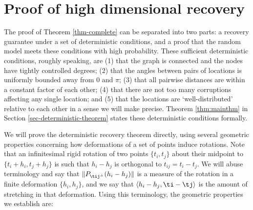 \section{Proof of high dimensional recovery} \label{sec-proofs-high-d}

The proof of Theorem \ref{thm-complete} can be separated into two parts:  a recovery guarantee under a set of deterministic conditions, and a proof that the random model meets these conditions with high probability.  These sufficient deterministic conditions, roughly speaking, are (1) that the graph is connected and the nodes have tightly controlled degrees; (2) that the angles between pairs of locations is uniformly bounded away from $0$ and $\pi$; (3) that all pairwise distances are within a constant factor of each other; (4) that there are not too many corruptions affecting any single location; and (5) that the locations are `well-distributed' relative to each other in a sense we will make precise.   Theorem \ref{thm:mainthm} in Section \ref{sec-deterministic-theorem} states these deterministic conditions formally.

We will prove the deterministic recovery theorem directly, using several geometric properties concerning how deformations of a set of points induce rotations.  
Note that an infinitesimal rigid rotation of two points $\{t_i, t_j\}$ about their midpoint to ${\{t_i + h_i, t_j + h_j\}}$ is such that $h_i - h_j$ is orthogonal to $t_{ij} = t_i - t_j$.  We will abuse terminology and say that $\|P_{\tij^\perp} (h_i - h_j)\|$ is a measure of the rotation in a finite deformation $\{h_i, h_j\}$, and we say that $\langle h_i - h_j, \ti - \tj \rangle$ is the amount of stretching in that deformation. Using this terminology, the geometric properties we establish are:

